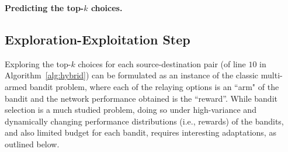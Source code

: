 \SetAlgoNoLine
\begin{algorithm}[t!]
\begin{small}

\nonl\hrulefill


\nonl\hrulefill


\nonl\hrulefill

\end{small}
 \caption{\bf Predicting the top-$k$ choices.}
\label{alg:pruning}
\end{algorithm}


\subsection{Exploration-Exploitation Step}
\label{subsec:practical-relaying}

Exploring the top-$k$ choices for each source-destination pair (\Explore of line $10$ in Algorithm~\ref{alg:hybrid}) can be formulated as an 
 instance of the classic multi-armed bandit problem, where each of the relaying options is an {``arm" of the bandit} and the network performance obtained is the ``reward''. While bandit selection is a much studied problem, doing so under high-variance and dynamically changing performance distributions (i.e., rewards) of the bandits, %
and also limited budget for each bandit, requires interesting adaptations, as outlined below. 

